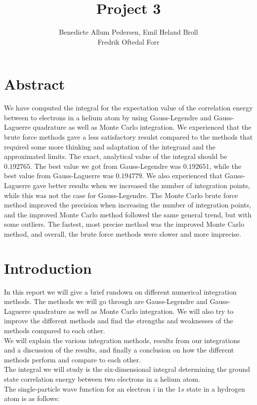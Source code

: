 \documentclass{article}
\title{Project 3}\vspace{-3ex}
\author{Benedicte Allum Pedersen, Emil Heland Broll\\ Fredrik Oftedal Forr}
\date{\vspace{-5ex}}
\begin{document}
\maketitle

\section*{Abstract}
	We have computed the integral for the expectation value of the correlation energy between to electrons in a helium atom by using Gauss-Legendre and Gauss-Laguerre quadrature as well as Monte Carlo integration. We experienced that the brute force methods gave a less satisfactory resulst compared to the methods that required some more thinking and adaptation of the integrand and the approximated limits. The exact, analytical value of the integral should be $0.192765$. The best value we got from Gauss-Legendre was $0.192651$, while the best value from Gauss-Laguerre was $0.194779$. We also experienced that Gauss-Laguerre gave better results when we increased the number of integration points, while this was not the case for Gauss-Legendre.
	The Monte Carlo brute force method improved the precision when increasing the number of integration points, and the improved Monte Carlo method followed the same general trend, but with some outliers.
	The fastest, most precise method was the improved Monte Carlo method, and overall, the brute force methods were slower and more imprecise.


\section*{Introduction}
	In this report we will give a brief rundown on different numerical integration methods. The methods we will go through are Gauss-Legendre and Gauss-Laguerre quadrature as well as Monte Carlo integration. We will also try to improve the different methods and find the strengths and weaknesses of the methods compared to each other.\\
	We will explain the various integration methods, results from our integrations and a discussion of the results, and finally a conclusion on how the different methods perform and compare to each other.\\

	The integral we will study is the six-dimensional integral determining the ground state correlation energy between two electrons in a helium atom.\\

	The single-particle wave function for an electron $i$ in the $1s$ state in a hydrogen atom is as follows:
\end{document}

